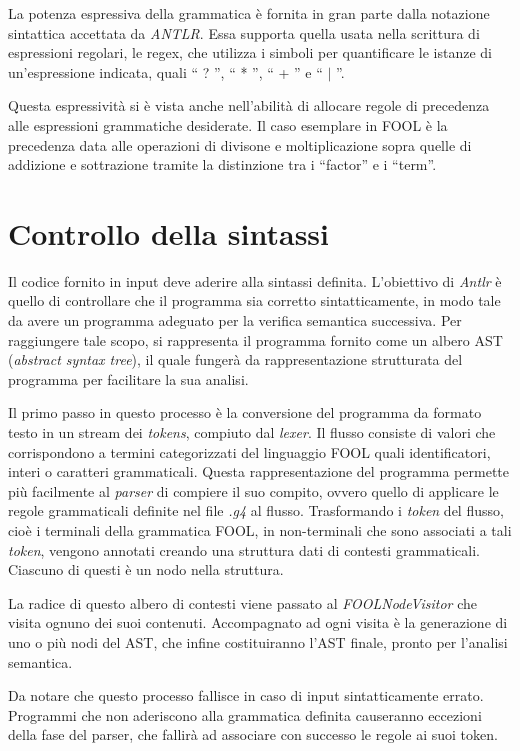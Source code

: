 \documentclass{scrreprt}
\begin{document}
La potenza espressiva della grammatica è fornita in gran parte dalla notazione sintattica accettata da 
\textit{ANTLR}. Essa supporta quella usata nella scrittura di espressioni regolari, le regex, che utilizza i 
simboli per quantificare le istanze di un’espressione indicata, quali `` ? '', `` * '', `` + '' e `` $\mid$ ''. 

Questa espressività si è vista anche nell'abilità di allocare regole di precedenza alle espressioni 
grammatiche desiderate. Il caso esemplare in FOOL è la precedenza data alle operazioni di divisone e 
moltiplicazione sopra quelle di addizione e sottrazione tramite la distinzione tra i ``factor'' e i ``term''. 


\section{Controllo della sintassi}

Il codice fornito in input deve aderire alla sintassi definita. L’obiettivo di \textit{Antlr} è quello di controllare che il programma sia 
corretto sintatticamente, in modo tale da avere un programma adeguato per la 
verifica semantica successiva. Per raggiungere tale scopo, si rappresenta il programma 
fornito come un albero AST (\textit{abstract syntax tree}), il quale fungerà da rappresentazione strutturata 
del programma per facilitare la sua analisi. 

Il primo passo in questo processo è la conversione del programma da formato testo in un stream dei 
\textit{tokens}, compiuto dal \textit{lexer}. Il flusso consiste di valori che corrispondono a termini categorizzati del 
linguaggio FOOL quali identificatori, interi o caratteri grammaticali. Questa rappresentazione del 
programma permette più facilmente al \textit{parser} di compiere il suo compito, ovvero quello di applicare 
le regole grammaticali definite nel file \textit{.g4} al flusso. Trasformando i \textit{token} del flusso, cioè i terminali 
della grammatica FOOL, in non-terminali che sono associati a tali \textit{token}, vengono annotati creando 
una struttura dati di contesti grammaticali. Ciascuno di questi è un nodo nella struttura. 

La radice di questo albero di contesti viene passato al \textit{FOOLNodeVisitor} che visita ognuno dei suoi 
contenuti. Accompagnato ad ogni visita è la generazione di uno o più nodi del AST, che infine 
costituiranno l’AST finale, pronto per l’analisi semantica.

Da notare che questo processo fallisce in caso di input sintatticamente errato. Programmi 
che non aderiscono alla grammatica definita causeranno eccezioni della fase
del parser, che fallirà ad associare con successo le regole ai suoi token. 
\end{document}
